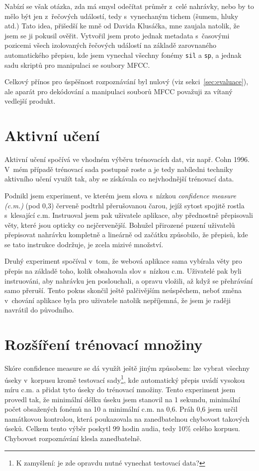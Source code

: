 Nabízí se však otázka, zda má smysl odečítat průměr z~celé nahrávky, nebo by to
mělo být jen z~řečových událostí, tedy s~vynechaným tichem (šumem, hluky atd.)
Tato idea, přišedší ke mně od Davida Klusáčka, mne zaujala natolik, že jsem se
ji pokusil ověřit. Vytvořil jsem proto jednak metadata s~časovými pozicemi všech
izolovaných řečových událostí na základě zarovnaného automatického přepisu, kde
jsem vynechal všechny fonémy \texttt{sil} a \texttt{sp}, a jednak sadu skriptů
pro manipulaci se soubory MFCC.

Celkový přínos pro úspěšnost rozpoznávání byl nulový (viz sekci~\ref{sec:evaluace}), ale aparát pro dekódování
a manipulaci souborů MFCC považuji za vítaný vedlejší produkt.

\section{Aktivní učení}

Aktivní učení spočívá ve vhodném výběru trénovacích dat, viz např. Cohn
1996\cite{cohn1996active}. V~mém případě trénovací sada postupně roste a je tedy
nabíledni techniky aktivního učení využít tak, aby se získávala co nejvhodnější
trénovací data.

Podnikl jsem experiment, ve kterém jsem slova s~nízkou {\em confidence
measure (c.m.)} (pod 0,3) červeně podtrhl přerušovanou čarou, jejíž sytost spojitě rostla
s~klesající c.m. Instruoval jsem pak uživatele aplikace, aby přednostně
přepisovali věty, které jsou opticky co nejčervenější. Bohužel přirozené puzení
uživatelů přepisovat nahrávku kompletně a lineárně od začátku způsobilo, že
přepisů, kde se tato instrukce dodržuje, je zcela mizivé množství.

Druhý experiment spočíval v~tom, že webová aplikace sama vybírala věty pro
přepis na základě toho, kolik obsahovala slov s~nízkou c.m. Uživatelé pak byli
instruováni, aby nahrávku jen poslouchali, a opravu vložili, až když se
přehrávání samo přeruší. Tento pokus skončil ještě palčivějším neúspěchem, neboť
změna v~chování aplikace byla pro uživatele natolik nepříjemná, že jsem je
raději navrátil do původního.

\section{Rozšíření trénovací množiny}
\label{sec:confident}

Skóre confidence measure se dá využít ještě jiným způsobem: lze vybrat všechny
úseky v~korpusu kromě testovací sady\footnote{K zamyšlení: je zde opravdu nutné
vynechat testovací data?}, kde automatický přepis uvádí vysokou míru
c.m. a přidat tyto úseky do trénovací množiny. Tento experiment jsem provedl
tak, že minimální délku úseku jsem stanovil na 1 sekundu, minimální počet
obsažených fonémů na 10 a minimální c.m. na 0,6. Práh 0,6 jsem určil namátkovou
kontrolou, která poukazovala na zanedbatelnou chybovost takových úseků. Celkem
tento výběr poskytl 99 hodin audia, tedy 10\% celého korpusu.
Chybovost rozpoznávání klesla zanedbatelně.

